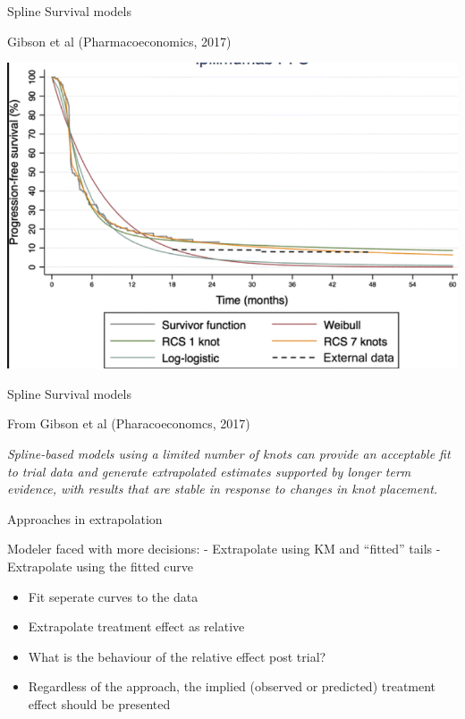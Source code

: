\documentclass[
  ignorenonframetext,
]{beamer}
\providecommand{\tightlist}{%
  \setlength{\itemsep}{0pt}\setlength{\parskip}{0pt}}
\begin{document}
\begin{frame}{Spline Survival models}
\protect\hypertarget{spline-survival-models-1}{}

Gibson et al (Pharmacoeconomics, 2017)

\includegraphics[width=1\linewidth]{figures/flexsurv}

\end{frame}

\begin{frame}{Spline Survival models}
\protect\hypertarget{spline-survival-models-2}{}

From Gibson et al (Pharacoeconomcs, 2017)

\emph{Spline-based models using a limited number of knots can provide an
acceptable fit to trial data and generate extrapolated estimates
supported by longer term evidence, with results that are stable in
response to changes in knot placement.}

\end{frame}

\begin{frame}{Approaches in extrapolation}
\protect\hypertarget{approaches-in-extrapolation}{}

Modeler faced with more decisions: - Extrapolate using KM and ``fitted''
tails - Extrapolate using the fitted curve

\begin{itemize}
\tightlist
\item
  Fit seperate curves to the data
\item
  Extrapolate treatment effect as relative
\item
  What is the behaviour of the relative effect post trial?
\item
  Regardless of the approach, the implied (observed or predicted)
  treatment effect should be presented
\end{itemize}

\end{frame}
\end{document}
